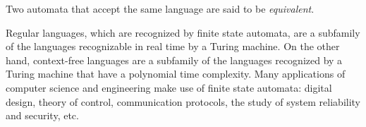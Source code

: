 \begin{definition}
    Two automata that accept the same language are said to be \emph{equivalent}. 
\end{definition}

Regular languages, which are recognized by finite state automata, are a subfamily of the languages recognizable in real time by a Turing machine. 
On the other hand, context-free languages are a subfamily of the languages recognized by a Turing machine  that have a polynomial time complexity. 
Many applications of computer science and engineering make use of finite state automata: digital design, theory of control, communication protocols, the study of system reliability and security, etc.